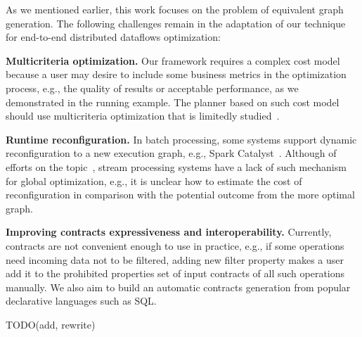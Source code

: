 As we mentioned earlier, this work focuses on the problem of equivalent graph generation. The following challenges remain in the adaptation of our technique for end-to-end distributed dataflows optimization:

\textbf{Multicriteria optimization.}
Our framework requires a complex cost model because a user may desire to include some business metrics in the optimization process, e.g., the quality of results or acceptable performance, as we demonstrated in the running example. The planner based on such cost model should use multicriteria optimization that is limitedly studied~\cite{yarygina2014optimizing}.

\textbf{Runtime reconfiguration.}
In batch processing, some systems support dynamic reconfiguration to a new execution graph, e.g., Spark Catalyst~\cite{armbrust2015spark}. Although of efforts on the topic~\cite{grulich2020grizzly}, stream processing systems have a lack of such mechanism for global optimization, e.g., it is unclear how to estimate the cost of reconfiguration in comparison with the potential outcome from the more optimal graph.

\textbf{Improving contracts expressiveness and interoperability.}
Currently, contracts are not convenient enough to use in practice, e.g., if some operations need incoming data not to be filtered, adding new filter property makes a user add it to the prohibited properties set of input contracts of all such operations manually. We also aim to build an automatic contracts generation from popular declarative languages such as SQL.

TODO(add, rewrite)
